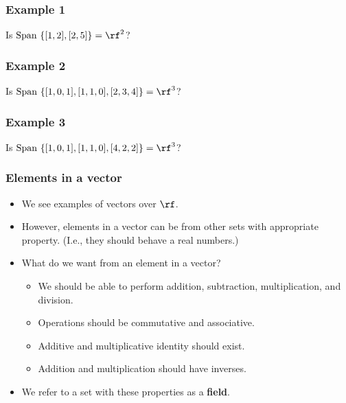 \begin{frame}
  \frametitle{Example 1}
  Is $\mathrm{Span}\ \{[1,2],[2,5]\} = \rf^2$?
  \vspace{2.5in}
\end{frame}

\begin{frame}
  \frametitle{Example 2}
  Is $\mathrm{Span}\ \{[1,0,1],[1,1,0],[2,3,4]\} = \rf^3$?
  \vspace{2.5in}
\end{frame}

\begin{frame}
  \frametitle{Example 3}
  Is $\mathrm{Span}\ \{[1,0,1],[1,1,0],[4,2,2]\} = \rf^3$?
  \vspace{2.5in}
\end{frame}

\begin{frame}
  \frametitle{Elements in a vector}
  \begin{itemize}
  \item We see examples of vectors over $\rf$.
  \item However, elements in a vector can be from other sets with
    appropriate property.  (I.e., they should behave a real numbers.)
  \item What do we want from an element in a vector?
    \begin{itemize}
    \item We should be able to perform addition, subtraction, multiplication, and division.
    \item Operations should be commutative and associative.
    \item Additive and multiplicative identity should exist.
    \item Addition and multiplication should have inverses.
    \end{itemize}

    \item We refer to a set with these properties as a {\bf field}.
  \end{itemize}
\end{frame}

